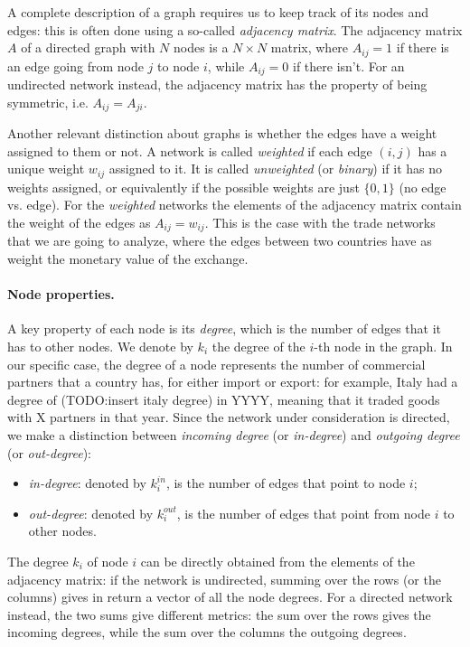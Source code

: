 A complete description of a graph requires us to keep track of its nodes and edges: this is often done using a so-called \textit{adjacency matrix}. The adjacency matrix $A$ of a directed graph with $N$ nodes is a $N \times N$ matrix, where $A_{ij} = 1$ if there is an edge going from node $j$ to node $i$, while $A_{ij} = 0$ if there isn't. For an undirected network instead, the adjacency matrix has the property of being symmetric, i.e. $A_{ij} = A_{ji}$.

Another relevant distinction about graphs is whether the edges have a weight assigned to them or not. A network is called \textit{weighted} if each edge $(i,j)$ has a unique weight $w_{ij}$ assigned to it. It is called \textit{unweighted} (or \textit{binary}) if it has no weights assigned, or equivalently if the possible weights are just $\{0,1\}$ (no edge vs. edge). For the \textit{weighted} networks the elements of the adjacency matrix contain the weight of the edges as $A_{ij} = w_{ij}$. This is the case with the trade networks that we are going to analyze, where the edges between two countries have as weight the monetary value of the exchange.


\paragraph{Node properties.}
A key property of each node is its \textit{degree}, which is the number of edges that it has to other nodes. We denote by $k_i$ the degree of the $i$-th node in the graph. In our specific case, the degree of a node represents the number of commercial partners that a country has, for either import or export: for example, Italy had a degree of (TODO:insert italy degree) in YYYY, meaning that it traded goods with X partners in that year.
Since the network under consideration is directed, we make a distinction between \textit{incoming degree} (or \textit{in-degree}) and \textit{outgoing degree} (or \textit{out-degree}):
\begin{itemize}
    \item \textit{in-degree}: denoted by $k_i^{in}$, is the number of edges that point to node $i$;
    \item \textit{out-degree}: denoted by $k_i^{out}$, is the number of edges that point from node $i$ to other nodes.
\end{itemize}
The degree $k_i$ of node $i$ can be directly obtained from the elements of the adjacency matrix: if the network is undirected, summing over the rows (or the columns) gives in return a vector of all the node degrees. For a directed network instead, the two sums give different metrics: the sum over the rows gives the incoming degrees, while the sum over the columns the outgoing degrees.


